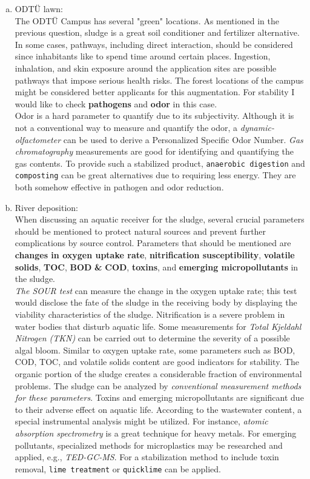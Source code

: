 \documentclass[a4paper]{article}
\begin{document}
\begin{enumerate}[a)]
    \item ODTÜ lawn:\\
    The ODTÜ Campus has several "green" locations. As mentioned in the previous question, sludge is a great soil conditioner and fertilizer alternative. In some cases, pathways, including direct interaction, should be considered since inhabitants like to spend time around certain places. Ingestion, inhalation, and skin exposure around the application sites are possible pathways that impose serious health risks. The forest locations of the campus might be considered better applicants for this augmentation. For stability I would like to check \textbf{pathogens} and \textbf{odor} in this case.\\
    Odor is a hard parameter to quantify due to its subjectivity. Although it is not a conventional way to measure and quantify the odor, a \textit{dynamic-olfactometer} can be used to derive a Personalized Specific Odor Number\autocite{vesilind1988}. \textit{Gas chromatography} measurements are good for identifying and quantifying the gas contents\autocite{sanin2011}. To provide such a stabilized product, \texttt{anaerobic digestion} and \texttt{composting} can be great alternatives due to requiring less energy. They are both somehow effective in pathogen and odor reduction.
    \item River deposition:\\
    When discussing an aquatic receiver for the sludge, several crucial parameters should be mentioned to protect natural sources and prevent further complications by source control. Parameters that should be mentioned are \textbf{changes in oxygen uptake rate}, \textbf{nitrification susceptibility}, \textbf{volatile solids}, \textbf{TOC}, \textbf{BOD} \textbf{\&} \textbf{COD}, \textbf{toxins}, and \textbf{emerging micropollutants} in the sludge.\\
    \textit{The SOUR test} can measure the change in the oxygen uptake rate; this test would disclose the fate of the sludge in the receiving body by displaying the viability characteristics of the sludge. Nitrification is a severe problem in water bodies that disturb aquatic life. Some measurements for \textit{Total Kjeldahl Nitrogen (TKN)} can be carried out to determine the severity of a possible algal bloom. Similar to oxygen uptake rate, some parameters such as BOD, COD, TOC, and volatile solids content are good indicators for stability. The organic portion of the sludge creates a considerable fraction of environmental problems. The sludge can be analyzed by \textit{conventional measurement methods for these parameters}. Toxins and emerging micropollutants are significant due to their adverse effect on aquatic life. According to the wastewater content, a special instrumental analysis might be utilized. For instance, \textit{atomic absorption spectrometry} is a great technique for heavy metals. For emerging pollutants, specialized methods for microplastics may be researched and applied, e.g., \textit{TED-GC-MS}. For a stabilization method to include toxin removal, \texttt{lime treatment} or \texttt{quicklime} can be applied\autocite{sanin2011}.

\end{enumerate}
\end{document}
